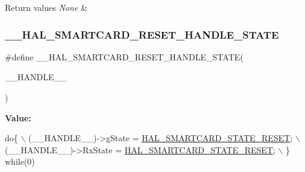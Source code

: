 \begin{DoxyRetVals}{Return values}
{\em None} & \\
\hline
\end{DoxyRetVals}
\mbox{\label{group___s_m_a_r_t_c_a_r_d___exported___macros_ga080b197f190ae36b8db1745a4db94bf4}} 
\subsubsection{\texorpdfstring{\+\_\+\+\_\+\+H\+A\+L\+\_\+\+S\+M\+A\+R\+T\+C\+A\+R\+D\+\_\+\+R\+E\+S\+E\+T\+\_\+\+H\+A\+N\+D\+L\+E\+\_\+\+S\+T\+A\+TE}{\_\_HAL\_SMARTCARD\_RESET\_HANDLE\_STATE}}
{\footnotesize\ttfamily \#define \+\_\+\+\_\+\+H\+A\+L\+\_\+\+S\+M\+A\+R\+T\+C\+A\+R\+D\+\_\+\+R\+E\+S\+E\+T\+\_\+\+H\+A\+N\+D\+L\+E\+\_\+\+S\+T\+A\+TE(\begin{DoxyParamCaption}\item[{}]{\+\_\+\+\_\+\+H\+A\+N\+D\+L\+E\+\_\+\+\_\+ }\end{DoxyParamCaption})}

{\bfseries Value\+:}
\begin{DoxyCode}
\textcolor{keywordflow}{do}\{                                                       \(\backslash\)
                                                           (\_\_HANDLE\_\_)->gState = 
      \hyperlink{group___s_m_a_r_t_c_a_r_d___exported___types_gga79d6a3b95636861dcfd70913746e087ea3bb178c89408959b462cf8bc607034cb}{HAL\_SMARTCARD\_STATE\_RESET};      \(\backslash\)
                                                           (\_\_HANDLE\_\_)->RxState = 
      \hyperlink{group___s_m_a_r_t_c_a_r_d___exported___types_gga79d6a3b95636861dcfd70913746e087ea3bb178c89408959b462cf8bc607034cb}{HAL\_SMARTCARD\_STATE\_RESET};     \(\backslash\)
                                                          \} \textcolor{keywordflow}{while}(0)
\end{DoxyCode}


